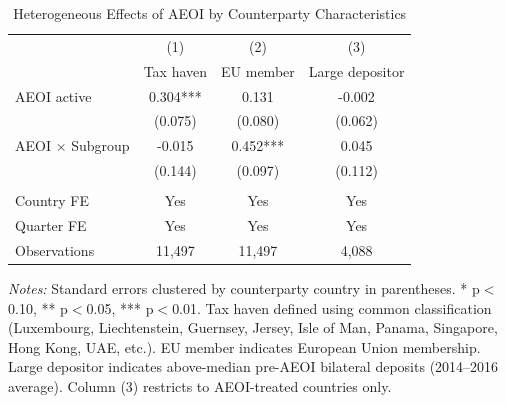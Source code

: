 \begin{table}[H]
\centering
\caption{Heterogeneous Effects of AEOI by Counterparty Characteristics}
\label{tab:hetero}
\begin{threeparttable}
\begin{tabular}{lccc}
\toprule
& (1) & (2) & (3) \\
& Tax haven & EU member & Large depositor \\
\midrule
AEOI active & 0.304*** & 0.131 & -0.002 \\
& (0.075) & (0.080) & (0.062) \\
AEOI $\times$ Subgroup & -0.015 & 0.452*** & 0.045 \\
& (0.144) & (0.097) & (0.112) \\
\\
Country FE & Yes & Yes & Yes \\
Quarter FE & Yes & Yes & Yes \\
Observations & 11,497 & 11,497 & 4,088 \\
\bottomrule
\end{tabular}
\begin{tablenotes}[flushleft]
\small
\item \textit{Notes:} Standard errors clustered by counterparty country in parentheses. * p$<$0.10, ** p$<$0.05, *** p$<$0.01. Tax haven defined using common classification (Luxembourg, Liechtenstein, Guernsey, Jersey, Isle of Man, Panama, Singapore, Hong Kong, UAE, etc.). EU member indicates European Union membership. Large depositor indicates above-median pre-AEOI bilateral deposits (2014--2016 average). Column (3) restricts to AEOI-treated countries only.
\end{tablenotes}
\end{threeparttable}
\end{table}
